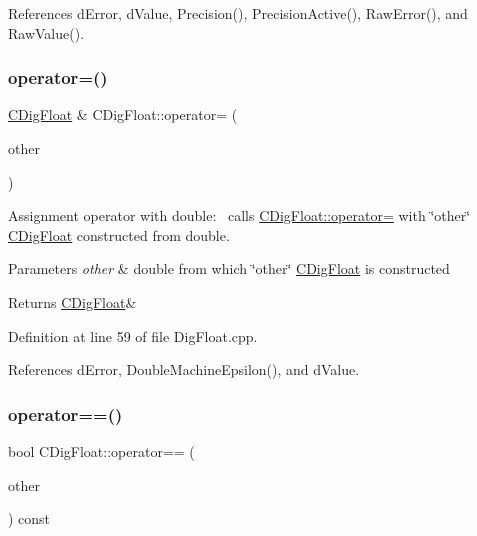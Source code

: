 References d\+Error, d\+Value, Precision(), Precision\+Active(), Raw\+Error(), and Raw\+Value().

\mbox{\label{classCDigFloat_a6113b805767862e3e98fac9a3e10c7cd}} 
\subsubsection{\texorpdfstring{operator=()}{operator=()}\hspace{0.1cm}{\footnotesize\ttfamily [2/2]}}
{\footnotesize\ttfamily \hyperlink{classCDigFloat}{C\+Dig\+Float} \& C\+Dig\+Float\+::operator= (\begin{DoxyParamCaption}\item[{const double}]{other }\end{DoxyParamCaption})}



Assignment operator with double\+:~\newline
 calls \hyperlink{classCDigFloat_a74f36566c2c79d7258b7b2dee35d46b2}{C\+Dig\+Float\+::operator=} with \char`\"{}other\char`\"{} \hyperlink{classCDigFloat}{C\+Dig\+Float} constructed from double. 


\begin{DoxyParams}{Parameters}
{\em other} & double from which \char`\"{}other\char`\"{} \hyperlink{classCDigFloat}{C\+Dig\+Float} is constructed \\
\hline
\end{DoxyParams}
\begin{DoxyReturn}{Returns}
\hyperlink{classCDigFloat}{C\+Dig\+Float}\& 
\end{DoxyReturn}


Definition at line 59 of file Dig\+Float.\+cpp.



References d\+Error, Double\+Machine\+Epsilon(), and d\+Value.

\mbox{\label{classCDigFloat_ad8980d984bf2bab71d15b830fd0180a5}} 
\subsubsection{\texorpdfstring{operator==()}{operator==()}\hspace{0.1cm}{\footnotesize\ttfamily [1/2]}}
{\footnotesize\ttfamily bool C\+Dig\+Float\+::operator== (\begin{DoxyParamCaption}\item[{const \hyperlink{classCDigFloat}{C\+Dig\+Float} \&}]{other }\end{DoxyParamCaption}) const}



